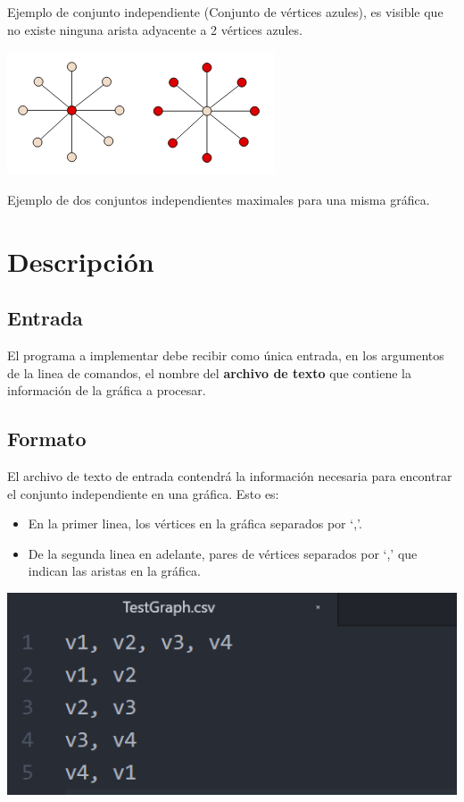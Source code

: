 \documentclass{article}
\begin{document}
Ejemplo de conjunto independiente (Conjunto de vértices azules), es visible que
no existe ninguna arista adyacente a 2 vértices azules.

\begin{center}
\includegraphics[scale=1]{graf2}
\end{center}

Ejemplo de dos conjuntos independientes maximales para una misma gráfica.

\section{Descripción}

\subsection{Entrada}

El programa a implementar debe recibir como única entrada, en los argumentos
de la linea de comandos, el nombre del \textbf{archivo de texto} que contiene la
información de la gráfica a procesar.

\subsection{Formato}

El archivo de texto de entrada contendrá la información necesaria para encontrar el conjunto independiente en una gráfica. Esto es:

\begin{itemize}
\item En la primer linea, los vértices en la gráfica separados por `,'.
\item De la segunda linea en adelante, pares de vértices separados por `,' que indican las aristas en la gráfica.
\end{itemize}

\includegraphics[scale=0.5]{test1}
\end{document}
